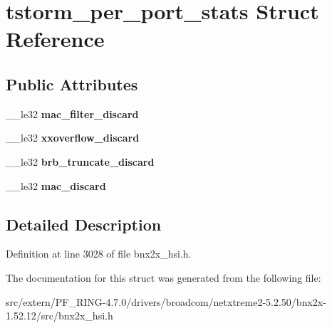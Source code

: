\hypertarget{structtstorm__per__port__stats}{
\section{tstorm\_\-per\_\-port\_\-stats Struct Reference}
\label{structtstorm__per__port__stats}
}
\subsection*{Public Attributes}
\begin{DoxyCompactItemize}
\item 
\hypertarget{structtstorm__per__port__stats_aff3d4ac7f7d2e5747ec02685665eeeab}{
\_\-\_\-le32 {\bfseries mac\_\-filter\_\-discard}}
\label{structtstorm__per__port__stats_aff3d4ac7f7d2e5747ec02685665eeeab}

\item 
\hypertarget{structtstorm__per__port__stats_af3f096564436f9deb867a4b23805e333}{
\_\-\_\-le32 {\bfseries xxoverflow\_\-discard}}
\label{structtstorm__per__port__stats_af3f096564436f9deb867a4b23805e333}

\item 
\hypertarget{structtstorm__per__port__stats_a8e0bc879a7846bc5d7b8800a0e1d8a4c}{
\_\-\_\-le32 {\bfseries brb\_\-truncate\_\-discard}}
\label{structtstorm__per__port__stats_a8e0bc879a7846bc5d7b8800a0e1d8a4c}

\item 
\hypertarget{structtstorm__per__port__stats_ab5410cf4704305ef3c2c82953bdf9e0b}{
\_\-\_\-le32 {\bfseries mac\_\-discard}}
\label{structtstorm__per__port__stats_ab5410cf4704305ef3c2c82953bdf9e0b}

\end{DoxyCompactItemize}


\subsection{Detailed Description}


Definition at line 3028 of file bnx2x\_\-hsi.h.



The documentation for this struct was generated from the following file:\begin{DoxyCompactItemize}
\item 
src/extern/PF\_\-RING-\/4.7.0/drivers/broadcom/netxtreme2-\/5.2.50/bnx2x-\/1.52.12/src/bnx2x\_\-hsi.h\end{DoxyCompactItemize}
